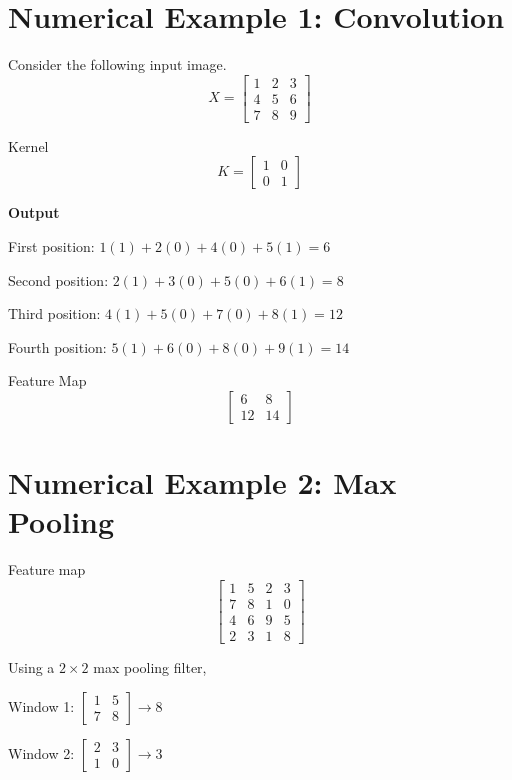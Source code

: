 \documentclass[11pt]{article}
\begin{document}
\section{Numerical Example 1: Convolution}

Consider the following input image.
\[
X =
\begin{bmatrix}
1 & 2 & 3 \\
4 & 5 & 6 \\
7 & 8 & 9
\end{bmatrix}
\]

Kernel
\[
K =
\begin{bmatrix}
1 & 0 \\
0 & 1
\end{bmatrix}
\]

\textbf{Output}

First position: $1(1) + 2(0) + 4(0) + 5(1) = 6$

Second position: $2(1) + 3(0) + 5(0) + 6(1) = 8$

Third position: $4(1) + 5(0) + 7(0) + 8(1) = 12$

Fourth position: $5(1) + 6(0) + 8(0) + 9(1) = 14$

Feature Map
\[
\begin{bmatrix}
6 & 8 \\
12 & 14
\end{bmatrix}
\]

\section{Numerical Example 2: Max Pooling}

Feature map
\[
\begin{bmatrix}
1 & 5 & 2 & 3 \\
7 & 8 & 1 & 0 \\
4 & 6 & 9 & 5 \\
2 & 3 & 1 & 8
\end{bmatrix}
\]

Using a $2 \times 2$ max pooling filter,

Window 1: $\begin{bmatrix} 1 & 5 \\ 7 & 8 \end{bmatrix} \rightarrow 8$

Window 2: $\begin{bmatrix} 2 & 3 \\ 1 & 0 \end{bmatrix} \rightarrow 3$
\end{document}
